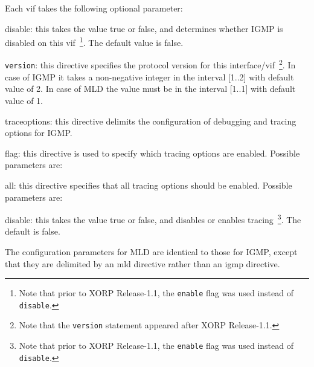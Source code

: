 \begin{description}
\begin{description}
  Each vif takes the following optional parameter:
\begin{description}
\item{\stt disable}: this takes the value {\stt true} or {\stt false},
  and determines whether IGMP is disabled on this vif~\footnote{Note
  that prior to XORP Release-1.1, the {\tt enable} flag was used instead of
  {\tt disable}.}.
  The default value is {\stt false}.
\item{\tt version}: this directive specifies the protocol version
  for this interface/vif~\footnote{Note that the {\tt version} statement
  appeared after XORP Release-1.1.}. In case of IGMP it takes a 
  non-negative integer in the interval [1..2] with default value of 2.
  In case of MLD the value must be in the interval [1..1] with default
  value of 1.
\end{description}
\end{description}
\item{\stt traceoptions}: this directive delimits the configuration of
  debugging and tracing options for IGMP.
\begin{description}
\item{\stt flag}: this directive is used to specify which tracing
  options are enabled.  Possible parameters are:
\begin{description}
\item{\stt all}: this directive specifies that all tracing
  options should be enabled.  Possible parameters are:
\begin{description}
\item{\stt disable}: this takes the value {\stt true} or {\stt false},
  and disables or enables tracing~\footnote{Note
  that prior to XORP Release-1.1, the {\tt enable} flag was used instead of
  {\tt disable}.}. The default is {\stt false}.
\end{description}
\end{description}
\end{description}
\end{description}

The configuration parameters for MLD are identical to those for IGMP,
except that they are delimited by an {\stt mld} directive rather than
an {\stt igmp} directive.

\vfill\eject
